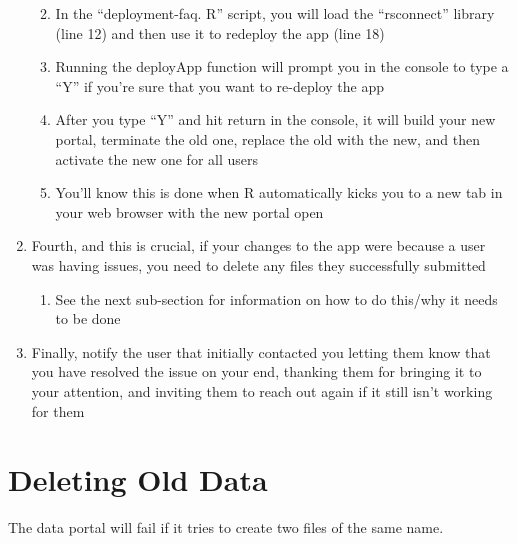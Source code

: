 \documentclass[
  letterpaper,
  oneside,
  open=any]{scrbook}
\providecommand{\tightlist}{%
  \setlength{\itemsep}{0pt}\setlength{\parskip}{0pt}}\usepackage{longtable,booktabs,array}
\begin{document}
\begin{enumerate}
  \begin{enumerate}
  \def\labelenumii{\roman{enumii}.}
  \item
    In the ``deployment-faq. R'' script, you will load the ``rsconnect''
    library (line 12) and then use it to redeploy the app (line 18)
  \item
    Running the deployApp function will prompt you in the console to
    type a ``Y'' if you're sure that you want to re-deploy the app
  \item
    After you type ``Y'' and hit return in the console, it will build
    your new portal, terminate the old one, replace the old with the
    new, and then activate the new one for all users
  \item
    You'll know this is done when R automatically kicks you to a new tab
    in your web browser with the new portal open
  \end{enumerate}
\item
  Fourth, and this is crucial, if your changes to the app were because a
  user was having issues, you need to delete any files they successfully
  submitted

  \begin{enumerate}
  \def\labelenumii{\roman{enumii}.}
  \tightlist
  \item
    See the next sub-section for information on how to do this/why it
    needs to be done
  \end{enumerate}
\item
  Finally, notify the user that initially contacted you letting them
  know that you have resolved the issue on your end, thanking them for
  bringing it to your attention, and inviting them to reach out again if
  it still isn't working for them
\end{enumerate}

\section{Deleting Old Data}\label{deleting-old-data}

The data portal will fail if it tries to create two files of the same
name.
\end{document}
